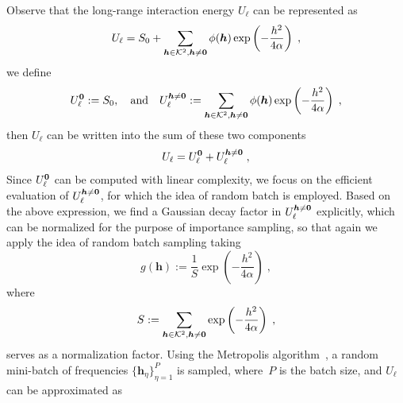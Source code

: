 Observe that the long-range interaction energy $U_\ell$ can be represented as
\[
U_\ell =   S_0+ \sum_{\boldsymbol{h}\in\mathcal{K}^2,\boldsymbol{h}\neq\bm{0}}\phi(\boldsymbol{h}) \exp\left(-\frac{h^2}{4\alpha}\right) \;,
\]
we define 
\begin{equation}\label{eq::U_l0_Ulk}
    U_\ell^{\bm{0}} := S_0,\quad\text{and}\quad U_\ell^{\boldsymbol{h}\neq \bm{0}} :=\sum_{\boldsymbol{h}\in\mathcal{K}^2,\boldsymbol{h}\neq\bm{0}}\phi(\boldsymbol{h}) \exp\left(-\frac{h^2}{4\alpha}\right) \;,
\end{equation}
then $U_\ell$ can be written into the sum of these two components
\[
U_\ell= U_\ell^{\bm{0}}+U_\ell^{\boldsymbol{h}\neq \bm{0}}\;,
\]
Since 
$ U_\ell^{\bm{0}}$
can be computed with linear complexity, we focus on the efficient evaluation of 
$U_\ell^{\boldsymbol{h}\neq \bm{0}}$, for which the idea of random batch is employed.
Based on the above expression, we find a Gaussian decay factor in $U_\ell^{\boldsymbol{h}\neq \bm{0}}$ explicitly, which can be normalized for the  purpose of importance sampling, so that again we apply the idea of random batch sampling taking
\begin{equation}\label{eq::hk}
	g(\bm{h}) := \frac{1}{S} \exp\left(-\frac{h^2}{4\alpha}\right)\;, %
\end{equation}
where \[S:= \sum_{\boldsymbol{h}\in\mathcal{K}^2,\boldsymbol{h}\neq\bm{0}}\exp\left(-\frac{h^2}{4\alpha}\right)\;,\] serves as a normalization factor.
%
%
%
%
Using the Metropolis algorithm~\cite{metropolis1953equation}, a random mini-batch of frequencies $\{\bm{h}_{\eta}\}_{\eta=1}^P$ is sampled, where~$P$ is the batch size, and $U_\ell$ can be approximated as 
